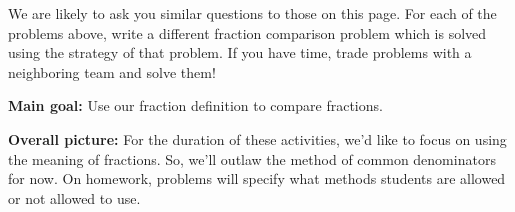 \documentclass[nooutcomes,noauthor, handout]{ximera}
\begin{document}
\begin{problem}
We are likely to ask you similar questions to those on this page. For each of the problems above, write a different fraction comparison problem which is solved using the strategy of that problem. If you have time, trade problems with a neighboring team and solve them!
\end{problem}





\newpage

\begin{instructorNotes} 



{\bf Main goal:} Use our fraction definition to compare fractions.

{\bf Overall picture:} For the duration of these activities, we'd like to focus on using the meaning of fractions. So, we'll outlaw  the method of common denominators for now. On homework, problems will specify what methods students are allowed or not allowed to use.





\end{instructorNotes}
\end{document}
